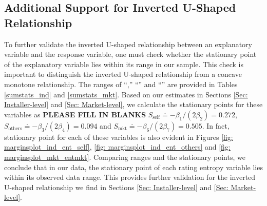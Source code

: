 \documentclass[msom,blindrev]{informs3}
\begin{document}
%
%
%
%




\subsection{Additional Support for Inverted U-Shaped Relationship}

To further validate the inverted U-shaped relationship between an explanatory variable and the response variable, one must check whether the stationary point of the explanatory variable lies within its range in our sample. This check is important to distinguish the inverted U-shaped relationship from a concave monotone relationship.  The ranges of ``,'' ``'' and ``'' are provided in Tables \ref{sumstats_ind} and \ref{sumstats_mkt}.
Based on our estimates in Sections \ref{Sec: Installer-level} and \ref{Sec: Market-level}, we calculate the stationary points for these variables as \textbf{PLEASE FILL IN BLANKS} $S_{\text{self}} \doteq - \beta_{1}/ (2 \beta_{2}) = 0.272$, $S_{\text{others}} \doteq  - \beta_{3}/(2 \beta_{4}) =0.094 $ and $S_{\text{mkt}} \doteq - \beta_{6}/(2 \beta_{7}) =0.505 $. In fact, stationary point for each of these variables is also evident in Figures \ref{fig: marginsplot_ind_ent_self}, \ref{fig: marginsplot_ind_ent_others} and \ref{fig: marginsplot_mkt_entmkt}. Comparing ranges and the stationary points, we conclude that in our data, the stationary point of each rating entropy variable lies within its observed data range. This provides further validation for the inverted U-shaped relationship we find in Sections \ref{Sec: Installer-level} and \ref{Sec: Market-level}.
\end{document}
